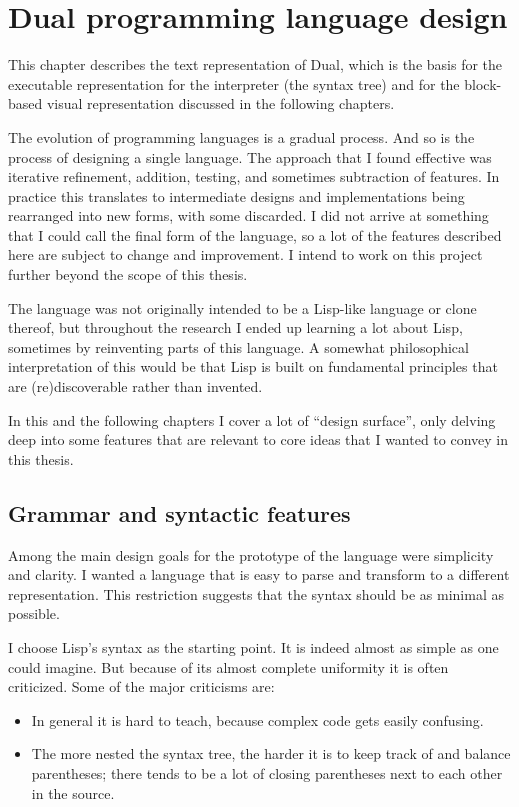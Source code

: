 \chapter{Dual programming language design}\label{chap:lang}
This chapter describes the text representation of Dual, which is the basis for the executable representation for the interpreter (the syntax tree) and for the block-based visual representation discussed in the following chapters.

The evolution of programming languages is a gradual process. And so is the process of designing a single language. The approach that I found effective was iterative refinement, addition, testing, and sometimes subtraction of features. In practice this translates to intermediate designs and implementations being rearranged into new forms, with some discarded. I did not arrive at something that I could call the final form of the language, so a lot of the features described here are subject to change and improvement. I intend to work on this project further beyond the scope of this thesis.

The language was not originally intended to be a Lisp-like language or clone thereof, but throughout the research I ended up learning a lot about Lisp, sometimes by reinventing parts of this language. A somewhat philosophical interpretation of this would be that Lisp is built on fundamental principles that are (re)discoverable rather than invented.

In this and the following chapters I cover a lot of ``design surface'', only delving deep into some features that are relevant to core ideas that I wanted to convey in this thesis.

\section{Grammar and syntactic features}
Among the main design goals for the prototype of the language were simplicity
and clarity. I wanted a language that is easy to parse and transform to a
different representation. This restriction suggests that the syntax should be as
minimal as possible.  

I choose Lisp's syntax as the starting point. It is indeed almost as simple as one could imagine. But because of its almost complete uniformity it is often criticized. Some of the major criticisms are:
\begin{itemize}
    \item In general it is hard to teach, because complex code gets easily confusing\cite{wadler_critique}.
    \item The more nested the syntax tree, the harder it is to keep track of and
      balance parentheses; there tends to be a lot of closing parentheses next
      to each other in the source\cite{c2_parentheses}.
\end{itemize}

